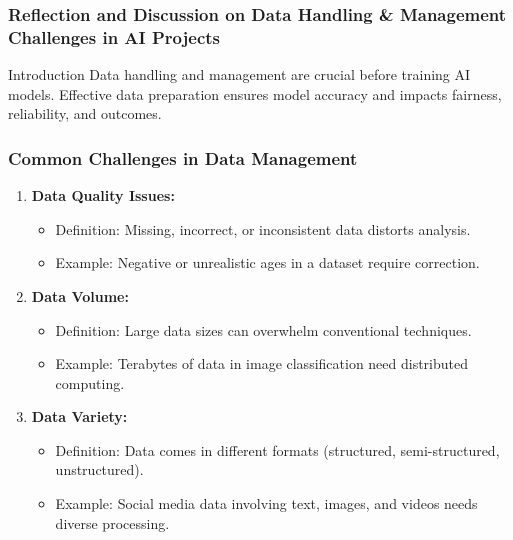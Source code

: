 \documentclass[aspectratio=169]{beamer}
\begin{document}
\begin{frame}[fragile]
    \frametitle{Reflection and Discussion on Data Handling \& Management Challenges in AI Projects}
    \begin{block}{Introduction}
        Data handling and management are crucial before training AI models. Effective data preparation ensures model accuracy and impacts fairness, reliability, and outcomes.
    \end{block}
\end{frame}

\begin{frame}[fragile]
    \frametitle{Common Challenges in Data Management}
    \begin{enumerate}
        \item \textbf{Data Quality Issues:}
            \begin{itemize}
                \item Definition: Missing, incorrect, or inconsistent data distorts analysis.
                \item Example: Negative or unrealistic ages in a dataset require correction.
            \end{itemize}
        \item \textbf{Data Volume:}
            \begin{itemize}
                \item Definition: Large data sizes can overwhelm conventional techniques.
                \item Example: Terabytes of data in image classification need distributed computing.
            \end{itemize}
        \item \textbf{Data Variety:}
            \begin{itemize}
                \item Definition: Data comes in different formats (structured, semi-structured, unstructured).
                \item Example: Social media data involving text, images, and videos needs diverse processing.
            \end{itemize}
    \end{enumerate}
\end{frame}
\end{document}
